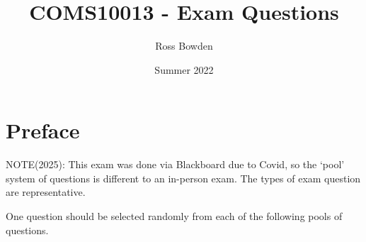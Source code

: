 \documentclass[a4paper, 11pt]{exam}
\title{COMS10013 - Exam Questions}
\author{Ross Bowden}
\date{Summer 2022}
\renewcommand{\thepartno}{\arabic{partno}}
\newcommand{\ifequals}[3]{\ifthenelse{\equal{#1}{#2}}{#3}{}}
\newcommand{\case}[2]{#1 #2} %
\newenvironment{switch}[1]{\renewcommand{\case}{\ifequals{#1}}}{}
\begin{document}
\maketitle

\section*{Preface}
NOTE(2025): This exam was done via Blackboard due to Covid, so the `pool' system of questions is different to an in-person exam. The types of exam question are representative. 

One question should be selected randomly from each of the following pools of questions. 

\begin{questions}


    \label{q:hessian}
    \newcommand{\qonequestion}{
        Consider the function $z(x,y) = ax^3y + by^2 - 3axy$, where $a$ and $b$ are real, positive constants. Which of the following statements is true.
    }
    \newcommand{\qonepoint}{
        \begin{switch}{\thepartno}
            \case{1}{(1, \frac{a}{b})}
            \case{2}{(-1, -\frac{a}{b})}
            \case{3}{(\sqrt{3}, 0)}
            \case{4}{(-\sqrt{3}, 0)}
        \end{switch}
    }
    \newcommand{\qonechoices}{
        \begin{choices}
            \choice The point $(x,y) = \qonepoint$ is a local maxima of $z$.
            \choice The point $(x,y) = \qonepoint$ is a local minima of $z$.
            \choice The point $(x,y) = \qonepoint$ is a saddle point of $z$.
            \choice None of the above.
        \end{choices}
    }
    \begin{parts}
        \part \qonequestion\qonechoices
        \part \qonequestion\qonechoices
        \part \qonequestion\qonechoices

\end{parts}
\end{questions}
\end{document}
